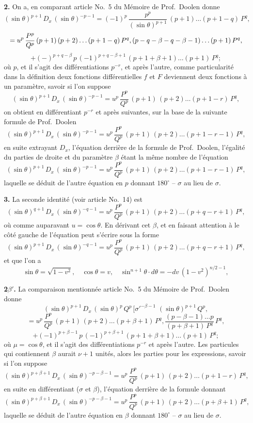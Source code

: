 \documentclass[11pt,a4paper]{article}
\begin{document}
\setcounter{page}{136}

\textbf{2.} On a, en comparant article No.~5 du Mémoire de Prof.~Doolen donne
\[
(\sin\theta)^{p+1}\,D_x\,(\sin\theta)^{-p-1} = (-1)^p\,\frac{p^p}{(\sin\theta)^{p+1}}\,(p+1)\ldots(p+1-q)\,P^q,
\]
\[
= u^p\,\frac{P^p}{Q^p}\,(p+1)\,(p+2)\ldots(p+1-q)\,P^q,\\(p-q-\beta-q-\beta-1)\ldots(p+1)\,P^q,
\]
\[
+(-)^{p+q-\beta}\,p\,(-1)^{p+q-\beta+1}\,(p+1+\beta+1)\ldots(p+1)\,P^q;
\]
où $p$, et il s'agit des différentiations $p^{-r}$, et après l'autre, comme particularité dans la définition deux fonctions différentielles $f$ et $F$ deviennent deux fonctions à un paramètre, savoir si l'on suppose
\[
(\sin\theta)^{p+1}\,D_x\,(\sin\theta)^{-p-1} = u^p\,\frac{P^p}{Q^p}\,(p+1)\,(p+2)\ldots(p+1-r)\,P^q,
\]
on obtient en différentiant $p^{-r}$ et après suivantes, sur la base de la suivante formule de Prof.~Doolen
\[
(\sin\theta)^{p+1}\,D_x\,(\sin\theta)^{-p-1} = u^p\,\frac{P^p}{Q^p}\,(p+1)\,(p+2)\ldots(p+1-r-1)\,P^q,
\]
en suite extrayant $D_x$, l'équation derrière de la formule de Prof.~Doolen, l'égalité du parties de droite et du paramètre $\beta$ étant la même nombre de l'équation
\[
(\sin\theta)^{p+1}\,D_x\,(\sin\theta)^{-p-1} = u^p\,\frac{P^p}{Q^p}\,(p+1)\,(p+2)\ldots(p+1-r-1)\,P^q,
\]
laquelle se déduit de l'autre équation en $p$ donnant $180^\circ$ -- $\sigma$ au lieu de $\sigma$.

\textbf{3.} La seconde identité (voir article No.~14) est
\[
(\sin\theta)^{q+1}\,D_x\,(\sin\theta)^{-q-1} = u^p\,\frac{P^p}{Q^p}\,(p+1)\,(p+2)\ldots(p+q-r+1)\,P^q,
\]
où comme auparavant $u = \cos\theta$. En dérivant cet $\beta$, et en faisant attention à le côté gauche de l'équation peut s'écrire sous la forme
\[
(\sin\theta)^{p+1}\,D_x\,(\sin\theta)^{-q-1} = u^p\,\frac{P^p}{Q^p}\,(p+1)\,(p+2)\ldots(p+q-r+1)\,P^q,
\]
et que l'on a
\[
\sin\theta = \sqrt{1-v^2},\quad \cos\theta = v,\quad \sin^{n+1}\theta\cdot d\theta = -dv\,(1-v^2)^{n/2-1},
\]

\setcounter{page}{137}

\textbf{2$\beta'$.} La comparaison mentionnée article No.~5 du Mémoire de Prof.~Doolen donne
\[
(\sin\theta)^{p+1}\,D_x\,(\sin\theta)^{p}\,Q^p\,[\sigma'^{-\beta-1}\,\,(\sin\theta)^{p+1}\,Q^p,
\]
\[
= u^p\,\frac{P^p}{Q^p}\,(p+1)\,(p+2)\ldots(p+\beta+1)\,P^q,\frac{(p-\beta-1)\ldots p}{(p+\beta+1)\,P^q}\,P^q,
\]
\[
+ (-1)^{p+\beta-1}\,p\,(-1)^{p+\beta+1}\,(p+1+\beta+1)\ldots(p+1)\,P^q;
\]
où $\mu = \cos\theta$, et il s'agit des différentiations $p^{-r}$ et après l'autre. Les particules qui contiennent $\beta$ aurait $\nu+1$ unités, alors les parties pour les expressions, savoir si l'on suppose
\[
(\sin\theta)^{p+\beta+1}\,D_x\,(\sin\theta)^{-p-\beta-1} = u^p\,\frac{P^p}{Q^p}\,(p+1)\,(p+2)\ldots(p+1-r)\,P^q,
\]
en suite en différentiant ($\sigma$ et $\beta$), l'équation derrière de la formule donnant
\[
(\sin\theta)^{p+\beta+1}\,D_x\,(\sin\theta)^{-p-\beta-1} = u^p\,\frac{P^p}{Q^p}\,(p+1)\,(p+2)\ldots(p+\beta+1)\,P^q,
\]
laquelle se déduit de l'autre équation en $\beta$ donnant $180^\circ$ -- $\sigma$ au lieu de $\sigma$.
\end{document}
